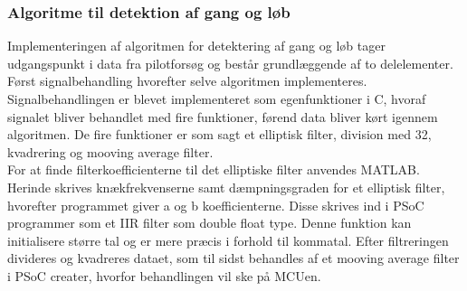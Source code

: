 \subsubsection{Algoritme til detektion af gang og løb}
Implementeringen af algoritmen for detektering af gang og løb tager udgangspunkt i data fra pilotforsøg og består grundlæggende af to delelementer. Først signalbehandling hvorefter selve algoritmen implementeres. Signalbehandlingen er blevet implementeret som egenfunktioner i C, hvoraf signalet bliver behandlet med fire funktioner, førend data bliver kørt igennem algoritmen. De fire funktioner er som sagt et elliptisk filter, division med 32, kvadrering og mooving average filter. \\
For at finde filterkoefficienterne til det elliptiske filter anvendes MATLAB. Herinde skrives knækfrekvenserne samt dæmpningsgraden for et elliptisk filter, hvorefter programmet giver a og b koefficienterne. Disse skrives ind i PSoC programmer som et IIR filter som double float type. Denne funktion kan initialisere større tal og er mere præcis i forhold til kommatal. Efter filtreringen divideres og kvadreres dataet, som til sidst behandles af et mooving average filter i PSoC creater, hvorfor behandlingen vil ske på MCUen.

